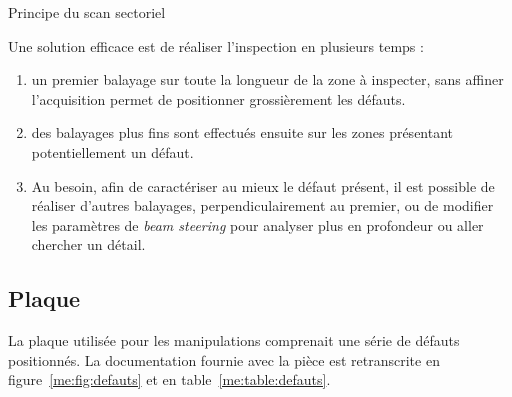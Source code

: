 \begin{figurehere}
    \centering
    \caption{Principe du scan sectoriel}
    \label{me:fig:sectoriel}
\end{figurehere}

Une solution efficace est de réaliser l'inspection en plusieurs temps :

\begin{enumerate}
    \item un premier balayage sur toute la longueur de la zone à inspecter, sans affiner l'acquisition permet de positionner grossièrement les défauts.
    \item des balayages plus fins sont effectués ensuite sur les zones présentant potentiellement un défaut.
    \item Au besoin, afin de caractériser au mieux le défaut présent, il est possible de réaliser d'autres balayages, perpendiculairement au premier, ou de modifier les paramètres de \textit{beam steering} pour analyser plus en profondeur ou aller chercher un détail.
\end{enumerate}

\subsection{Plaque}

La plaque utilisée pour les manipulations comprenait une série de défauts positionnés.
La documentation fournie avec la pièce est retranscrite en figure~\ref{me:fig:defauts} et en table~\ref{me:table:defauts}.


